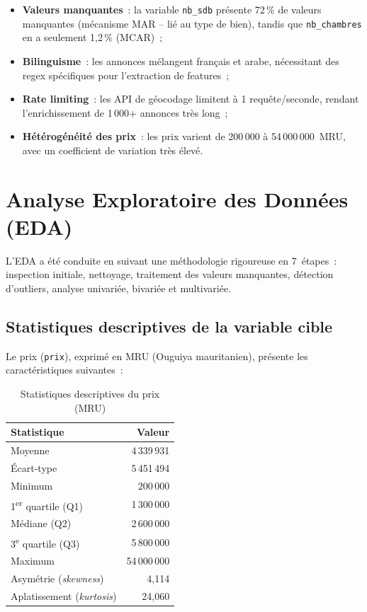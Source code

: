 \documentclass[12pt, a4paper]{article}
\begin{document}
\begin{itemize}
    \item \textbf{Valeurs manquantes}~: la variable \texttt{nb\_sdb} présente 72\,\% de valeurs manquantes (mécanisme MAR -- lié au type de bien), tandis que \texttt{nb\_chambres} en a seulement 1,2\,\% (MCAR)~;
    \item \textbf{Bilinguisme}~: les annonces mélangent français et arabe, nécessitant des regex spécifiques pour l'extraction de features~;
    \item \textbf{Rate limiting}~: les API de géocodage limitent à 1 requête/seconde, rendant l'enrichissement de 1\,000+ annonces très long~;
    \item \textbf{Hétérogénéité des prix}~: les prix varient de 200\,000 à 54\,000\,000~MRU, avec un coefficient de variation très élevé.
\end{itemize}

\section{Analyse Exploratoire des Données (EDA)}

L'EDA a été conduite en suivant une méthodologie rigoureuse en 7~étapes~: inspection initiale, nettoyage, traitement des valeurs manquantes, détection d'outliers, analyse univariée, bivariée et multivariée.

\subsection{Statistiques descriptives de la variable cible}

Le prix (\texttt{prix}), exprimé en MRU (Ouguiya mauritanien), présente les caractéristiques suivantes~:

\begin{table}[H]
\centering
\caption{Statistiques descriptives du prix (MRU)}
\label{tab:prix_stats}
\begin{tabular}{lr}
\toprule
\textbf{Statistique} & \textbf{Valeur} \\
\midrule
Moyenne & 4\,339\,931 \\
Écart-type & 5\,451\,494 \\
Minimum & 200\,000 \\
1\textsuperscript{er} quartile (Q1) & 1\,300\,000 \\
Médiane (Q2) & 2\,600\,000 \\
3\textsuperscript{e} quartile (Q3) & 5\,800\,000 \\
Maximum & 54\,000\,000 \\
Asymétrie (\textit{skewness}) & 4,114 \\
Aplatissement (\textit{kurtosis}) & 24,060 \\
\bottomrule
\end{tabular}
\end{table}
\end{document}
